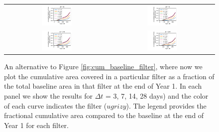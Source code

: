 \documentclass[preprintm,linenumbers]{aastex631}
\begin{document}
		\begin{figure}
			\centering
			\begin{tabular}{c c}
				\includegraphics[width=0.3\textwidth]{results/first_year_one_snap_v4_0_10yrs_db_noDD_noTwi_cumFrac_baseline_3.pdf} &
				\includegraphics[width=0.3\textwidth]{results/first_year_one_snap_v4_0_10yrs_db_noDD_noTwi_cumFrac_baseline_7.pdf} \\
				\includegraphics[width=0.3\textwidth]{results/first_year_one_snap_v4_0_10yrs_db_noDD_noTwi_cumFrac_baseline_14.pdf} &
				\includegraphics[width=0.3\textwidth]{results/first_year_one_snap_v4_0_10yrs_db_noDD_noTwi_cumFrac_baseline_28.pdf}
			\end{tabular}
			\caption{ An alternative to Figure \ref{fig:cum_baseline_filter}, where now we plot the cumulative area covered in a particular filter as a fraction of the total baseline area in that filter at the end of Year 1.
				In each panel we show the results for $\Delta t$ = 3, 7, 14, 28 days) and the color of each curve indicates the filter ($ugrizy$).
				The legend provides the fractional cumulative area compared to the baseline at the end of Year 1 for each filter.
			}
			\label{fig:cumFrac_baseline}
		\end{figure}
  
\end{document}
